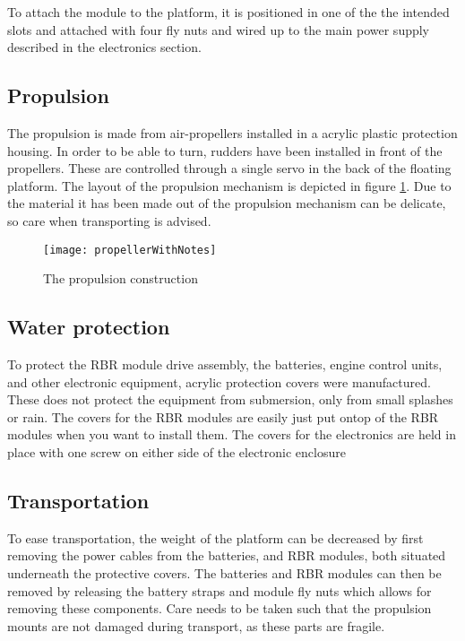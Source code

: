 To attach the module to the platform, it is positioned in one of the the intended slots and attached with four fly nuts and wired up to the main power supply described in the electronics section.

\subsection{Propulsion}
The propulsion is made from air-propellers installed in a acrylic plastic protection housing. In order to be able to turn, rudders have been installed in front of the propellers. These are controlled through a single servo in the back of the floating platform. The layout of the propulsion mechanism is depicted in figure \ref{fig:propellerWithNotes}. Due to the material it has been made out of the propulsion mechanism can be delicate, so care when transporting is advised. 
\begin{figure}[h]
   \centering
   \texttt{[image: propellerWithNotes]}
   \caption{The propulsion construction}
   \label{fig:propellerWithNotes}
\end{figure}

\subsection{Water protection}
To protect the RBR module drive assembly, the batteries, engine control units, and other electronic equipment, acrylic protection covers were manufactured. These does not protect the equipment from submersion, only from small splashes or rain. The covers for the RBR modules are easily just put ontop of the RBR modules when you want to install them. The covers for the electronics are held in place with one screw on either side of the electronic enclosure

\subsection{Transportation}
To ease transportation, the weight of the platform can be decreased by first removing the power cables from the batteries, and RBR modules, both situated underneath the protective covers. The batteries and RBR modules can then be removed by releasing the battery straps and module fly nuts which allows for removing these components. Care needs to be taken such that the propulsion mounts are not damaged during transport, as these parts are fragile.

